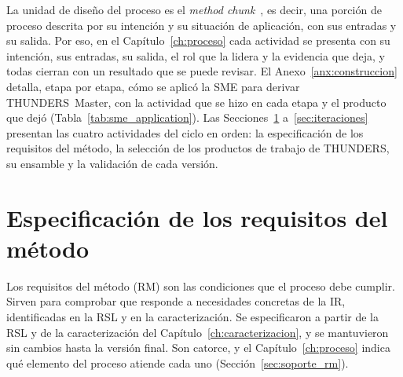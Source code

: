 \documentclass[12pt,letterpaper,oneside]{report}
\begin{document}
La unidad de diseño del proceso es el \textit{method
chunk}~\cite{ralyte2001assembly,mirbel2006sme}, es decir, una porción de proceso
descrita por su intención y su situación de aplicación, con sus entradas y su
salida. Por eso, en el Capítulo~\ref{ch:proceso} cada actividad se presenta con
su intención, sus entradas, su salida, el rol que la lidera y la evidencia que
deja, y todas cierran con un resultado que se puede revisar.
El Anexo~\ref{anx:construccion} detalla, etapa por etapa, cómo se aplicó la SME
para derivar THUNDERS~Master, con la actividad que se hizo en cada etapa y el
producto que dejó (Tabla~\ref{tab:sme_application}). Las
Secciones~\ref{sec:requisitos_metodo} a~\ref{sec:iteraciones} presentan las
cuatro actividades del ciclo en orden: la especificación de los requisitos del
método, la selección de los productos de trabajo de THUNDERS, su ensamble y la validación
de cada versión.


\section{Especificación de los requisitos del método}
\label{sec:requisitos_metodo}
Los requisitos del método (RM) son las condiciones que el proceso debe cumplir.
Sirven para comprobar que responde a necesidades concretas de la IR,
identificadas en la RSL y en la caracterización.
Se especificaron a partir de la RSL y de la caracterización
del Capítulo~\ref{ch:caracterizacion}, y se mantuvieron sin cambios hasta la
versión final. Son catorce, y el Capítulo~\ref{ch:proceso} indica qué elemento
del proceso atiende cada uno (Sección~\ref{sec:soporte_rm}).
\end{document}
